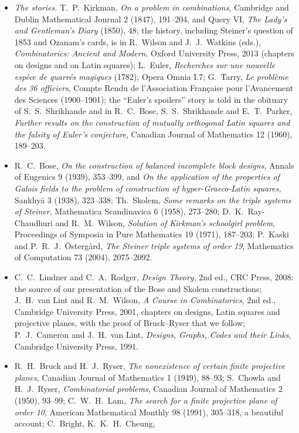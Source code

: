 \begin{itemize}
\item \emph{The stories.} T.~P.~Kirkman, \emph{On a problem in combinations}, Cambridge and Dublin Mathematical Journal 2 (1847), 191--204, and Query VI, \emph{The Lady's and Gentleman's Diary} (1850), 48; the history,
including Steiner's question of 1853 and Ozanam's cards, is in R.~Wilson and J.~J.~Watkins (eds.), \emph{Combinatorics: Ancient and Modern}, Oxford University Press, 2013 (chapters on designs and on Latin squares);
L.~Euler, \emph{Recherches sur une nouvelle esp\`ece de quarr\'es magiques} (1782), Opera Omnia I.7; G.~Tarry, \emph{Le probl\`eme des 36 officiers}, Compte Rendu de l'Association Fran\c{c}aise pour l'Avancement des
Sciences (1900--1901); the ``Euler's spoilers'' story is told in the obituary of S.~S.~Shrikhande and in R.~C.~Bose, S.~S.~Shrikhande and E.~T.~Parker, \emph{Further results on the construction of mutually orthogonal Latin
squares and the falsity of Euler's conjecture}, Canadian Journal of Mathematics 12 (1960), 189--203.
\item R.~C.~Bose, \emph{On the construction of balanced incomplete block designs}, Annals of Eugenics 9 (1939), 353--399, and \emph{On the application of the properties of Galois fields to the problem of construction of
hyper-Graeco-Latin squares}, Sankhy\=a 3 (1938), 323--338; Th.~Skolem, \emph{Some remarks on the triple systems of Steiner}, Mathematica Scandinavica 6 (1958), 273--280; D.~K.~Ray-Chaudhuri and R.~M.~Wilson, \emph{Solution of Kirkman's
schoolgirl problem}, Proceedings of Symposia in Pure Mathematics 19 (1971), 187--203; P.~Kaski and P.~R.~J.~\"Osterg\aa rd, \emph{The Steiner triple systems of order 19}, Mathematics of Computation 73 (2004), 2075--2092.
\item C.~C.~Lindner and C.~A.~Rodger, \emph{Design Theory}, 2nd ed., CRC Press, 2008: the source of our presentation of the Bose and Skolem constructions; J.~H.~van Lint and R.~M.~Wilson, \emph{A Course in Combinatorics},
2nd ed., Cambridge University Press, 2001, chapters on designs, Latin squares and projective planes, with the proof of Bruck--Ryser that we follow; P.~J.~Cameron and J.~H.~van Lint, \emph{Designs, Graphs, Codes and
their Links}, Cambridge University Press, 1991.
\item R.~H.~Bruck and H.~J.~Ryser, \emph{The nonexistence of certain finite projective planes}, Canadian Journal of Mathematics 1 (1949), 88--93; S.~Chowla and H.~J.~Ryser, \emph{Combinatorial problems}, Canadian
Journal of Mathematics 2 (1950), 93--99; C.~W.~H.~Lam, \emph{The search for a finite projective plane of order 10}, American Mathematical Monthly 98 (1991), 305--318, a beautiful account; C.~Bright, K.~K.~H.~Cheung,

\end{itemize}
